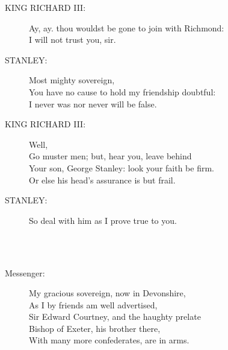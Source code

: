 \documentclass{article}
\begin{document}
\begin{description}
\item[KING RICHARD III:] 
\hspace{1pt}Ay, ay. thou wouldst be gone to join with Richmond:\\
\hspace{1pt}I will not trust you, sir.\\
\end{description}
\begin{description}
\item[STANLEY:] 
\hspace{1pt}Most mighty sovereign,\\
\hspace{1pt}You have no cause to hold my friendship doubtful:\\
\hspace{1pt}I never was nor never will be false.\\
\end{description}
\begin{description}
\item[KING RICHARD III:] 
\hspace{1pt}Well,\\
\hspace{1pt}Go muster men; but, hear you, leave behind\\
\hspace{1pt}Your son, George Stanley: look your faith be firm.\\
\hspace{1pt}Or else his head's assurance is but frail.\\
\end{description}
\begin{description}
\item[STANLEY:] 
\hspace{1pt}So deal with him as I prove true to you.\\
\end{description}
\centering{\it [Exit]}\\
\\
\begin{description}
\item[Messenger:] 
\hspace{1pt}My gracious sovereign, now in Devonshire,\\
\hspace{1pt}As I by friends am well advertised,\\
\hspace{1pt}Sir Edward Courtney, and the haughty prelate\\
\hspace{1pt}Bishop of Exeter, his brother there,\\
\hspace{1pt}With many more confederates, are in arms.\\
\end{description}
\end{document}
